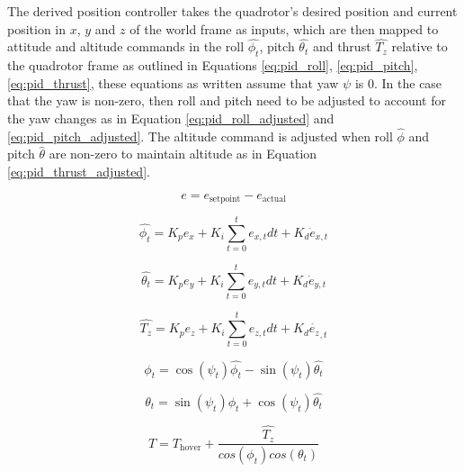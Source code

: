 \documentclass[11pt, twocolumn]{article}
\begin{document}
The derived position controller takes the quadrotor's desired position and current position in $x$, $y$ and $z$ of the world frame as inputs, which are then mapped to attitude and altitude commands in the roll $\hat{\phi_t}$, pitch $\hat{\theta_t}$ and thrust $\hat{T_z}$ relative to the quadrotor frame as outlined in Equations \ref{eq:pid_roll}, \ref{eq:pid_pitch}, \ref{eq:pid_thrust}, these equations as written assume that yaw $\psi$ is 0. In the case that the yaw is non-zero, then roll and pitch need to be adjusted to account for the yaw changes as in Equation \ref{eq:pid_roll_adjusted} and \ref{eq:pid_pitch_adjusted}. The altitude command is adjusted when roll $\hat{\phi}$ and pitch $\hat{\theta}$ are non-zero to maintain altitude as in Equation \ref{eq:pid_thrust_adjusted}. 

\begin{equation}
	\label{eq:pid_error}
	e = e_{\text{setpoint}} - e_{\text{actual}}
\end{equation}

\begin{equation}
	\label{eq:pid_roll}
	\hat{\phi_t} = K_p e_x + K_i \sum_{t = 0}^{t} e_{x, t} dt + K_d \dot{e}_{x,t}
\end{equation}

\begin{equation}
	\label{eq:pid_pitch}
	\hat{\theta_t} = K_p e_y + K_i \sum_{t = 0}^{t} e_{y,t} dt + K_d \dot{e}_{y ,t}
\end{equation}

\begin{equation}
	\label{eq:pid_thrust}
	\hat{T_z} =
		K_p e_z + K_i \sum_{t=0}^{t} e_{z,t} dt + K_d \dot{e_z}_{,t} 
\end{equation}

\begin{equation}
	\label{eq:pid_roll_adjusted}
	\phi_t = \cos(\psi_t) \hat{\phi_t} - \sin(\psi_t) \hat{\theta_t}
\end{equation}

\begin{equation}
	\label{eq:pid_pitch_adjusted}
	\theta_t = \sin(\psi_t) \hat{\phi_t} + \cos(\psi_t) \hat{\theta_t}
\end{equation}

\begin{equation}
	\label{eq:pid_thrust_adjusted}
	T = 
		T_{\text{hover}} +
		\frac{\hat{T_{z}}}{cos(\phi_t) cos(\theta_t)}
\end{equation}
\end{document}
